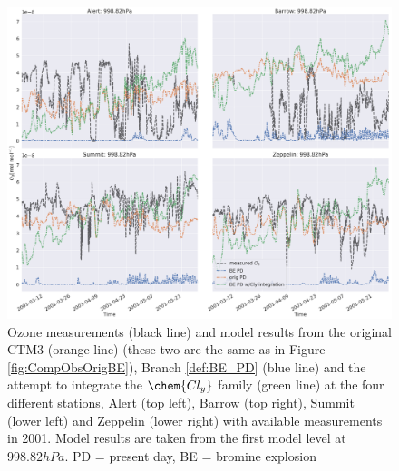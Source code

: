 \begin{figure}
    \centering
    \includegraphics[width = \linewidth]{Chapter6_Results/images/ozone_2001_newClyIntegration.png}
    \caption{Ozone measurements (black line) and model results from the original CTM3 (orange line) (these two are the same as in Figure \ref{fig:CompObsOrigBE}), Branch \ref{def:BE_PD} (blue line) and the attempt to integrate the $\chem{Cl_y}$ family (green line) at the four different stations, Alert (top left), Barrow (top right), Summit (lower left) and Zeppelin (lower right) with available measurements in 2001. Model results are taken from the first model level at $998.82 hPa$. PD = present day, BE = bromine explosion}
    \label{fig:test_ClyInt}
\end{figure}